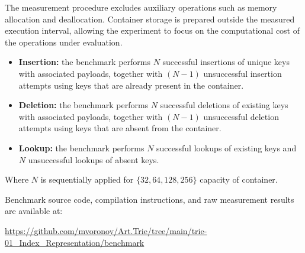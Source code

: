 \documentclass[11pt,twoside]{article}
\begin{document}
    The measurement procedure excludes auxiliary operations such
    as memory allocation and deallocation. Container storage is
    prepared outside the measured execution interval, allowing
    the experiment to focus on the computational cost of the
    operations under evaluation.

    \begin{itemize}
        \item \textbf{Insertion:} the benchmark performs $N$
        successful insertions of unique keys with associated payloads,
        together with $(N-1)$ unsuccessful insertion attempts using
        keys that are already present in the container.

        \item \textbf{Deletion:} the benchmark performs $N$
        successful deletions of existing keys with associated
        payloads, together with $(N-1)$ unsuccessful deletion
        attempts using keys that are absent from the container.

        \item \textbf{Lookup:} the benchmark performs $N$ successful
        lookups of existing keys and $N$ unsuccessful lookups
        of absent keys.
    \end{itemize}

    Where $N$ is sequentially applied for \(\{32, 64, 128, 256\}\) capacity of container.

    Benchmark source code, compilation instructions, and raw
    measurement results are available at:

    \url{https://github.com/mvoronoy/Art.Trie/tree/main/trie-01_Index_Representation/benchmark}

    
\end{document}
